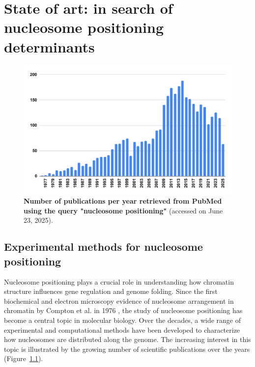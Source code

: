 \documentclass[11pt]{book}
\begin{document}
\chapter{State of art: in search of nucleosome positioning determinants}
\begin{figure}[htbp]
    \centering
    \includegraphics[width=\textwidth]{Figures/Introduction/query_nucpos.pdf}
    \caption{\textbf{Number of publications per year retrieved from PubMed using the query "nucleosome positioning"} (accessed on June 23, 2025).}
    \label{fig:query_nucpos}
\end{figure}


\section{Experimental methods for nucleosome positioning}
Nucleosome positioning plays a crucial role in understanding how chromatin structure influences gene regulation and genome folding. Since the first biochemical and electron microscopy evidence of nucleosome arrangement in chromatin by Compton et al. in 1976 \cite{comptonBiochemicalElectronmicroscopicEvidence1976}, the study of nucleosome positioning has become a central topic in molecular biology. Over the decades, a wide range of experimental and computational methods have been developed to characterize how nucleosomes are distributed along the genome.
The increasing interest in this topic is illustrated by the growing number of scientific publications over the years (Figure~\ref{fig:query_nucpos}). 
\end{document}
